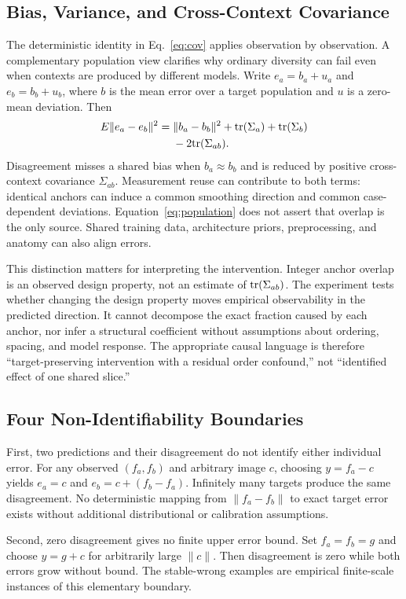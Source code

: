 \documentclass[journal,10pt]{IEEEtran}
\begin{document}
\subsection{Bias, Variance, and Cross-Context Covariance}
The deterministic identity in Eq.~\eqref{eq:cov} applies observation by observation. A complementary population view clarifies why ordinary diversity can fail even when contexts are produced by different models. Write $e_a=b_a+u_a$ and $e_b=b_b+u_b$, where $b$ is the mean error over a target population and $u$ is a zero-mean deviation. Then
\begin{align}
E\|e_a-e_b\|^2 ={}& \|b_a-b_b\|^2 + {\rm tr}(\Sigma_a)+{\rm tr}(\Sigma_b) \\
&-2{\rm tr}(\Sigma_{ab}). \label{eq:population}
\end{align}
Disagreement misses a shared bias when $b_a\approx b_b$ and is reduced by positive cross-context covariance $\Sigma_{ab}$. Measurement reuse can contribute to both terms: identical anchors can induce a common smoothing direction and common case-dependent deviations. Equation~\eqref{eq:population} does not assert that overlap is the only source. Shared training data, architecture priors, preprocessing, and anatomy can also align errors.

This distinction matters for interpreting the intervention. Integer anchor overlap is an observed design property, not an estimate of ${\rm tr}(\Sigma_{ab})$. The experiment tests whether changing the design property moves empirical observability in the predicted direction. It cannot decompose the exact fraction caused by each anchor, nor infer a structural coefficient without assumptions about ordering, spacing, and model response. The appropriate causal language is therefore ``target-preserving intervention with a residual order confound,'' not ``identified effect of one shared slice.''

\subsection{Four Non-Identifiability Boundaries}
First, two predictions and their disagreement do not identify either individual error. For any observed $(f_a,f_b)$ and arbitrary image $c$, choosing $y=f_a-c$ yields $e_a=c$ and $e_b=c+(f_b-f_a)$. Infinitely many targets produce the same disagreement. No deterministic mapping from $\|f_a-f_b\|$ to exact target error exists without additional distributional or calibration assumptions.

Second, zero disagreement gives no finite upper error bound. Set $f_a=f_b=g$ and choose $y=g+c$ for arbitrarily large $\|c\|$. Then disagreement is zero while both errors grow without bound. The stable-wrong examples are empirical finite-scale instances of this elementary boundary.
\end{document}
